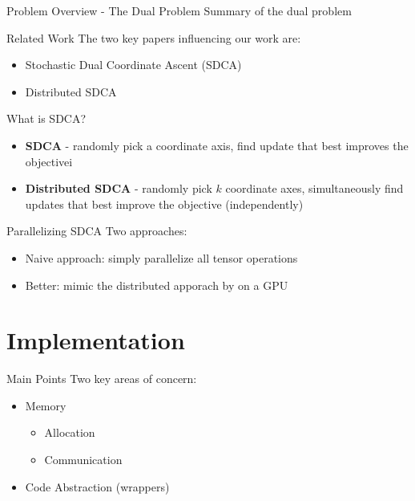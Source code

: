 \documentclass{beamer}
\begin{document}
\begin{frame}{Problem Overview - The Dual Problem}
  Summary of the dual problem
\end{frame}
%
\begin{frame}{Related Work}
  The two key papers influencing our work are:
	\begin{itemize}
	  \item  Stochastic Dual Coordinate Ascent (SDCA) \cite{shalev2013stochastic}
	  \item Distributed SDCA  \cite{yang2013trading,yang2013analysis}
	\end{itemize}
\end{frame}

\begin{frame}{What is SDCA?}
  \begin{itemize}
    \item \textbf{SDCA} - randomly pick a coordinate axis, find update that best improves
      the objectivei\vspace{1em}
    \item \textbf{Distributed SDCA} - randomly pick $k$ coordinate axes, simultaneously
      find updates that best improve the objective (independently)
  \end{itemize}
\end{frame}

\begin{frame}{Parallelizing SDCA}
  Two approaches:
	\begin{itemize}
	\item Naive approach: simply parallelize all tensor operations \pause
  \item Better: mimic the distributed apporach by \cite{yang2013trading} on a GPU
	\end{itemize}
\end{frame}
\section{Implementation}
\begin{frame}{Main Points}
  Two key areas of concern:
  \begin{itemize}
    \item Memory
      \begin{itemize}
        \item Allocation
        \item Communication
      \end{itemize}\pause
    \item Code Abstraction (wrappers)
  \end{itemize}
\end{frame}
\end{document}
